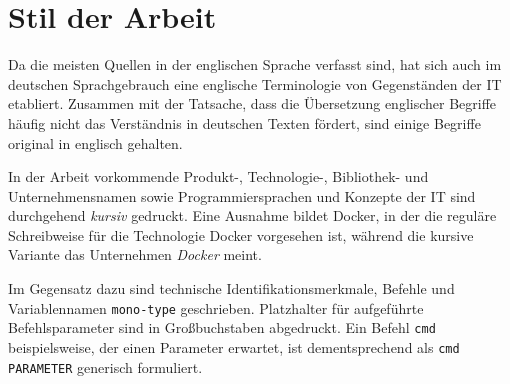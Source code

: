 \documentclass[../main.tex]{subfiles}
\begin{document}
  \section{Stil der Arbeit}
    Da die meisten Quellen in der englischen Sprache verfasst sind, hat sich auch im deutschen Sprachgebrauch eine englische Terminologie von Gegenständen der IT etabliert. Zusammen mit der Tatsache, dass die Übersetzung englischer Begriffe häufig nicht das Verständnis in deutschen Texten fördert, sind einige Begriffe original in englisch gehalten.

    In der Arbeit vorkommende Produkt-, Technologie-, Bibliothek- und Unternehmensnamen sowie Programmiersprachen und Konzepte der IT sind durchgehend \emph{kursiv} gedruckt. Eine Ausnahme bildet Docker, in der die reguläre Schreibweise für die Technologie Docker vorgesehen ist, während die kursive Variante das Unternehmen \emph{Docker} meint.

    Im Gegensatz dazu sind technische Identifikationsmerkmale, Befehle und Variablennamen \texttt{mono-type} geschrieben. Platzhalter für aufgeführte Befehlsparameter sind in Großbuchstaben abgedruckt. Ein Befehl \texttt{cmd} beispielsweise, der einen Parameter erwartet, ist dementsprechend als \texttt{cmd PARAMETER} generisch formuliert.
\end{document}
